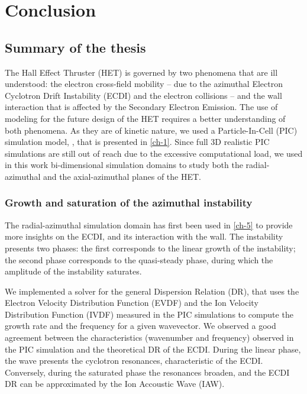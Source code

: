 
\chapter{Conclusion}
\label{ch-conclusion}

\section{Summary of the thesis}

  The Hall Effect Thruster (HET) is governed by two phenomena that are ill understood\string: the electron cross-field mobility -- due to the azimuthal Electron Cyclotron Drift Instability (ECDI) and the electron collisions -- and the wall interaction that is affected by the Secondary Electron Emission.
  The use of modeling for the future design  of the HET requires a better understanding of both phenomena. 
  As they are of kinetic nature, we used a Particle-In-Cell (PIC) simulation model, \LPPic, that is presented in \cref{ch-1}.
  Since full 3D realistic PIC simulations are still out of reach due to the excessive computational load, we used in this work bi-dimensional simulation domains to study both the radial-azimuthal and the axial-azimuthal planes of the HET.

  \subsection{Growth and saturation of the azimuthal instability}

    The radial-azimuthal simulation domain has first been used in \cref{ch-5} to provide more insights on the \ac{ECDI}, and its interaction with the wall.
    The instability presents two phases\string: the first corresponds to the linear growth of the instability; the second phase corresponds to the quasi-steady phase, during which the amplitude of the instability saturates.

    We implemented a solver for the general Dispersion Relation (DR), that uses the Electron Velocity Distribution Function (EVDF) and the Ion Velocity Distribution Function (IVDF) measured in the PIC simulations to compute the growth rate and the frequency for a given wavevector.
    We observed a good agreement between the characteristics (wavenumber and frequency) observed in the \ac{PIC} simulation and the theoretical DR of the ECDI.
    During the linear phase, the wave presents the cyclotron resonances, characteristic of the ECDI.
    Conversely, during the saturated phase the resonances broaden, and the ECDI DR can be approximated by the Ion Accoustic Wave (IAW).

